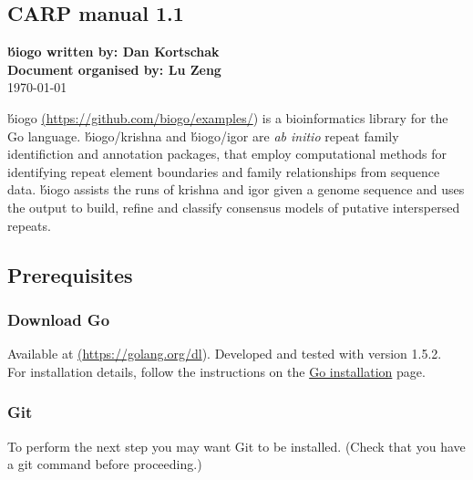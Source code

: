 \documentclass[12pt]{report}
\begin{document}
 \sloppy

\author{Author Name}
\date{Day Month Year}


\begin{center}
	\section*{CARP manual 1.1}
	\noindent\textbf{\'biogo written by: Dan Kortschak} \\
	\textbf{Document organised by: Lu Zeng} \\
	\today
\end{center}

\noindent\'biogo \href{<url>}(\url{https://github.com/biogo/examples/}) is a bioinformatics library for the Go language. \'biogo/krishna and \'biogo/igor are \textit{ab initio} repeat family identifiction and annotation packages, that employ computational methods for identifying repeat element boundaries and family relationships from sequence data. \'biogo assists the runs of krishna and igor given a genome sequence and uses the output to build, refine and classify consensus models of putative interspersed repeats. 


\subsection*{{Prerequisites}}

\subsubsection*{ Download Go }
Available at \href{<url>} (\url{https://golang.org/dl}). Developed and tested with version 1.5.2. \\
For installation details, follow the instructions on the \href{https://golang.org/doc/install#install} {\color{blue}Go installation} page.


\subsubsection*{ Git}
To perform the next step you may want Git to be installed. (Check that you have a git command before proceeding.) \\
\end{document}
